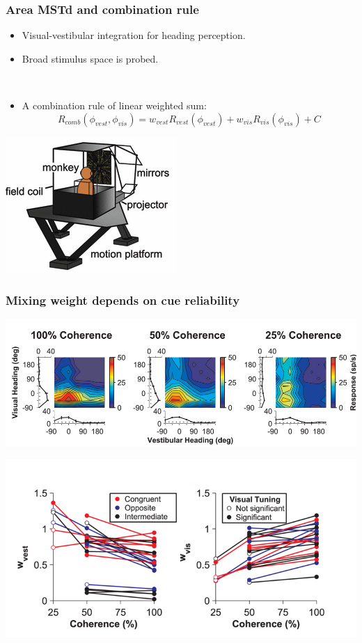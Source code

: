 \documentclass{beamer}
\begin{document}
\begin{frame}
  \frametitle{Area MSTd and combination rule \cite{morgan_multisensory_2008}}
  \begin{itemize}
    \item Visual-vestibular integration for heading perception.
    \item Broad stimulus space is probed.

    ~
    \item A combination rule of  linear weighted sum:
\begin{equation}
  R_{comb}(\phi_{vest}, \phi_{vis}) = w_{vest} R_{vest}(\phi_{vest}) + w_{vis} R_{vis}(\phi_{vis}) + C 
  \label{eq:lincomb}
\end{equation}
  \end{itemize}
  \begin{center}
    \includegraphics[scale=.4]{apparatus}
  \end{center}
\end{frame}

\begin{frame}
  \frametitle{Mixing weight depends on cue reliability \cite{morgan_multisensory_2008}}
  \begin{center}
    \includegraphics[width=\textwidth]{coherence}

    \includegraphics[width=.7\textwidth]{weight}
  \end{center}
\end{frame}
\end{document}
